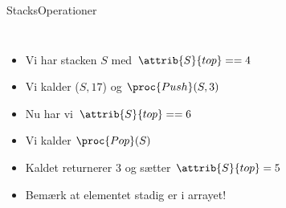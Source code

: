 \documentclass[aspectratio=1610]{beamer}
\begin{document}
\begin{frame}{Stacks}{Operationer}
\begin{columns}


        \begin{itemize}
            \small
            \item<4-> Vi har stacken $S$ med $\attrib{S}{top} == 4$
            \item<5-> Vi kalder ($S, 17$) og $\proc{Push}(S,3)$
            \item<6-> Nu har vi $\attrib{S}{top} == 6$
            \item<7-> Vi kalder $\proc{Pop}(S)$
            \item<8-> Kaldet returnerer 3 og sætter $\attrib{S}{top} = 5$
            \item<9-> Bemærk at \alert{elementet stadig er i arrayet!}
        \end{itemize}

        \begin{figure}[h]
            \centering
        \end{figure}


\end{columns}
\end{frame}
\end{document}
